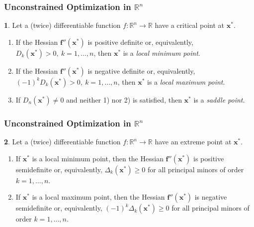 \documentclass[10pt]{beamer}
\theoremstyle{definition}
\newtheorem{Fact}{\translate{Fact}}
\begin{document}
\begin{frame}[fragile]
\frametitle{Unconstrained Optimization in $ \mathbb{R}^n $}
\begin{Fact}
Let a (twice) differentiable function $ f: \mathbb{R}^n \rightarrow \mathbb{R} $ have a critical point at $ \mathbf{x^*} $.
\begin{enumerate}
\item If the Hessian  $ \mathbf{f''(x^*)} $ is positive definite or, equivalently, $ D_k(\mathbf{x^*})>0,~k=1,\ldots,n $, then $ \mathbf{x^*} $ is a \emph{local minimum point}.
\item If the Hessian  $ \mathbf{f''(x^*)} $ is negative definite or, equivalently, $ (-1)^k D_k(\mathbf{x^*})>0,~k=1,\ldots,n $, then $ \mathbf{x^*} $ is a \emph{local maximum point}.
\item If $ D_n(\mathbf{x^*})\neq 0 $ and neither 1) nor 2) is satisfied, then $ \mathbf{x^*} $ is a \emph{saddle point}.
\end{enumerate}
\label{fc:ScsRn}
\end{Fact}
\end{frame}

\begin{frame}[fragile]
\frametitle{Unconstrained Optimization in $ \mathbb{R}^n $}
\begin{Fact}
Let a (twice) differentiable function $ f: \mathbb{R}^n \rightarrow \mathbb{R} $ have an extreme point at $ \mathbf{x^*} $.
\begin{enumerate}
\item If $ \mathbf{x^*} $ is a local minimum point, then the Hessian  $ \mathbf{f''(x^*)} $ is positive semidefinite or, equivalently, $ \Delta_k(\mathbf{x^*})\geq 0$ for all principal minors of order $ k=1,\ldots,n $.
\item If $ \mathbf{x^*} $ is a local maximum point, then the Hessian  $ \mathbf{f''(x^*)} $ is negative semidefinite or, equivalently, $ (-1)^k \Delta_k(\mathbf{x^*})\geq 0$ for all principal minors of order $ k=1,\ldots,n $.
\end{enumerate}
\label{fc:NcsRn}
\end{Fact}
\end{frame}
\end{document}
